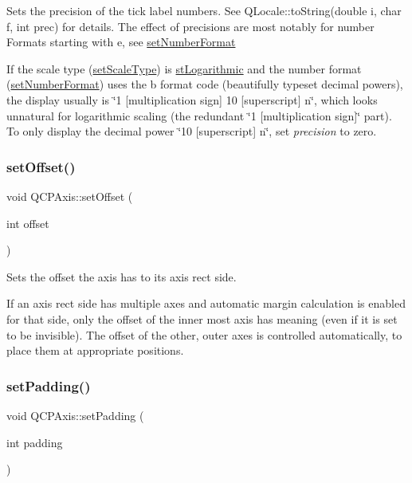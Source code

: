 Sets the precision of the tick label numbers. See Q\+Locale\+::to\+String(double i, char f, int prec) for details. The effect of precisions are most notably for number Formats starting with \textquotesingle{}e\textquotesingle{}, see \mbox{\hyperlink{class_q_c_p_axis_ae585a54dc2aac662e90a2ca82f002590}{set\+Number\+Format}}

If the scale type (\mbox{\hyperlink{class_q_c_p_axis_adef29cae617af4f519f6c40d1a866ca6}{set\+Scale\+Type}}) is \mbox{\hyperlink{class_q_c_p_axis_a36d8e8658dbaa179bf2aeb973db2d6f0abf5b785ad976618816dc6f79b73216d4}{st\+Logarithmic}} and the number format (\mbox{\hyperlink{class_q_c_p_axis_ae585a54dc2aac662e90a2ca82f002590}{set\+Number\+Format}}) uses the \textquotesingle{}b\textquotesingle{} format code (beautifully typeset decimal powers), the display usually is \char`\"{}1 \mbox{[}multiplication sign\mbox{]} 10 \mbox{[}superscript\mbox{]} n\char`\"{}, which looks unnatural for logarithmic scaling (the redundant \char`\"{}1 \mbox{[}multiplication sign\mbox{]}\char`\"{} part). To only display the decimal power \char`\"{}10
\mbox{[}superscript\mbox{]} n\char`\"{}, set {\itshape precision} to zero. \mbox{\label{class_q_c_p_axis_a04a652603cbe50eba9969ee6d68873c3}} 
\subsubsection{\texorpdfstring{set\+Offset()}{setOffset()}}
{\footnotesize\ttfamily void Q\+C\+P\+Axis\+::set\+Offset (\begin{DoxyParamCaption}\item[{int}]{offset }\end{DoxyParamCaption})}

Sets the offset the axis has to its axis rect side.

If an axis rect side has multiple axes and automatic margin calculation is enabled for that side, only the offset of the inner most axis has meaning (even if it is set to be invisible). The offset of the other, outer axes is controlled automatically, to place them at appropriate positions. \mbox{\label{class_q_c_p_axis_a5691441cb3de9e9844855d339c0db279}} 
\subsubsection{\texorpdfstring{set\+Padding()}{setPadding()}}
{\footnotesize\ttfamily void Q\+C\+P\+Axis\+::set\+Padding (\begin{DoxyParamCaption}\item[{int}]{padding }\end{DoxyParamCaption})}

